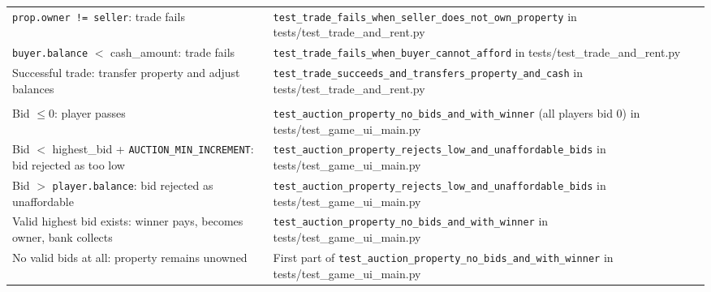 \documentclass[11pt]{article}
\begin{document}
\begin{longtable}{>{\raggedright\arraybackslash}p{} >{\raggedright\arraybackslash}p{}}
\multicolumn{2}{l}{\textbf{moneypoly.game: trade}} \\ \hline
\texttt{prop.owner != seller}: trade fails & \texttt{test\_trade\_fails\_when\_seller\_does\_not\_own\_property} in tests/test\_trade\_and\_rent.py \\ \hline
\texttt{buyer.balance} $<$ cash\_amount: trade fails & \texttt{test\_trade\_fails\_when\_buyer\_cannot\_afford} in tests/test\_trade\_and\_rent.py \\ \hline
Successful trade: transfer property and adjust balances & \texttt{test\_trade\_succeeds\_and\_transfers\_property\_and\_cash} in tests/test\_trade\_and\_rent.py \\ \hline

\multicolumn{2}{l}{\textbf{moneypoly.game: auction\_property}} \\ \hline
Bid $\leq 0$: player passes & \texttt{test\_auction\_property\_no\_bids\_and\_with\_winner} (all players bid 0) in tests/test\_game\_ui\_main.py \\ \hline
Bid $<$ highest\_bid + \texttt{AUCTION\_MIN\_INCREMENT}: bid rejected as too low & \texttt{test\_auction\_property\_rejects\_low\_and\_unaffordable\_bids} in tests/test\_game\_ui\_main.py \\ \hline
Bid $>$ \texttt{player.balance}: bid rejected as unaffordable & \texttt{test\_auction\_property\_rejects\_low\_and\_unaffordable\_bids} in tests/test\_game\_ui\_main.py \\ \hline
Valid highest bid exists: winner pays, becomes owner, bank collects & \texttt{test\_auction\_property\_no\_bids\_and\_with\_winner} in tests/test\_game\_ui\_main.py \\ \hline
No valid bids at all: property remains unowned & First part of \texttt{test\_auction\_property\_no\_bids\_and\_with\_winner} in tests/test\_game\_ui\_main.py \\ \hline


\end{longtable}
\end{document}
